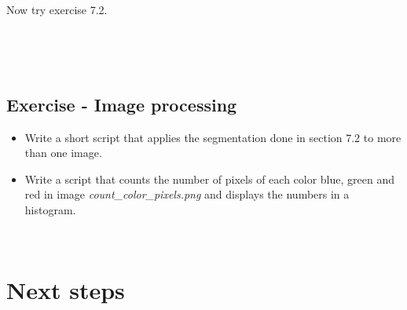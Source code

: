 \documentclass[11pt]{amsart}
\begin{document}
\

Now try exercise 7.2.

\












\

\subsection{Exercise - Image processing}

\begin{itemize}
\item Write a short script that applies the segmentation done in section 7.2 to more than one image.
\item Write a script that counts the number of pixels of each color blue, green and red in image {\it count\_color\_pixels.png} and displays the numbers in a histogram.
\end{itemize}

\

\section{Next steps}
\end{document}
